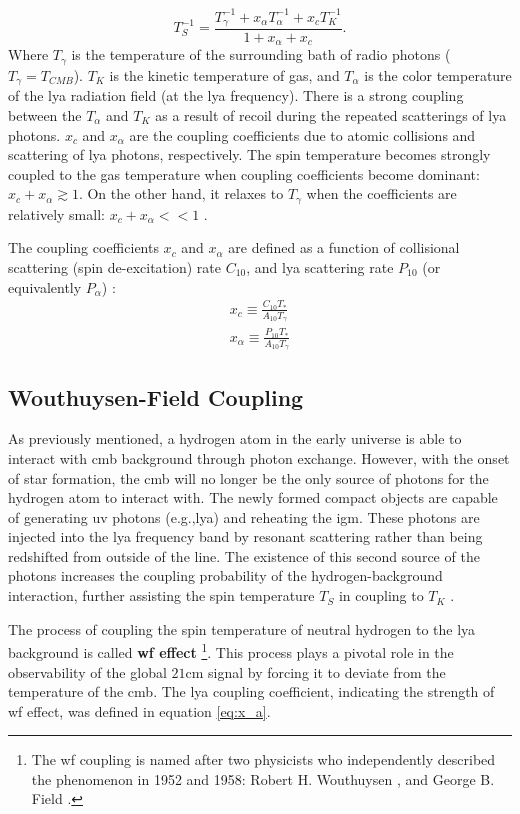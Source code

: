 \documentclass[12pt, TexShade, letterpaper]{report}
\begin{document}
\begin{equation}
    T^{-1}_S = \frac{T^{-1}_\gamma + x_\alpha T^{-1}_\alpha + x_c T^{-1}_K}{1 + x_\alpha + x_c}. \label{eq:spin_temperature_coupling}
\end{equation}
Where $T_\gamma$ is the temperature of the surrounding bath of radio photons ($T_\gamma = T_{CMB}$). $T_K$ is the kinetic temperature of gas, and $T_\alpha$ is the color temperature of the \gls{lya} radiation field (at the \gls{lya} frequency). There is a strong coupling between the $T_\alpha$ and $T_K$ as a result of recoil during the repeated scatterings of \gls{lya} photons. $x_c$ and $x_\alpha$ are the coupling coefficients due to atomic collisions and scattering of \gls{lya} photons, respectively. The spin temperature becomes strongly coupled to the gas temperature when coupling coefficients become dominant: $x_c + x_\alpha \gtrsim 1$. On the other hand, it relaxes to $T_\gamma$ when the coefficients are relatively small: $x_c + x_\alpha << 1$ \cite{21century, low_frequency}. \par
The coupling coefficients $x_c$ and $x_\alpha$ are defined as a function of collisional scattering (spin de-excitation) rate $C_{10}$, and \gls{lya} scattering rate $P_{10}$ (or equivalently $P_\alpha$) \cite{explore_cosmic_dawn, low_frequency}:
\begin{gather}
    x_c \equiv \frac{C_{10}T_*}{A_{10}T_\gamma}\\
    x_\alpha \equiv \frac{P_{10} T_*}{A_{10}T_\gamma} \label{eq:x_a}
\end{gather}
\subsection{Wouthuysen-Field Coupling}
As previously mentioned, a hydrogen atom in the early universe is able to interact with \gls{cmb} background through photon exchange. However, with the onset of star formation, the \gls{cmb} will no longer be the only source of photons for the hydrogen atom to interact with. The newly formed compact objects are capable of generating \gls{uv} photons (e.g.,\gls{lya}) and reheating the \gls{igm}. These photons are injected into the \gls{lya} frequency band by resonant scattering rather than being redshifted from outside of the line. The existence of this second source of the photons increases the coupling probability of the hydrogen-background interaction, further assisting the spin temperature $T_S$ in coupling to $T_K$ \cite{21century, low_frequency}.\par
The process of coupling the spin temperature of neutral hydrogen to the \gls{lya} background is called \textbf{\gls{wf} effect} \cite{barkana2001beginning}\footnote{The \gls{wf} coupling is named after two physicists who independently described the phenomenon in 1952 and 1958: Robert H. Wouthuysen \cite{wouthuysen_original}, and George B. Field \cite{field_original}.}. This process plays a pivotal role in the observability of the global $\mathrm{21cm}$ signal by forcing it to deviate from the temperature of the \gls{cmb}. The \gls{lya} coupling coefficient, indicating the strength of \gls{wf} effect, was defined in equation \ref{eq:x_a}. \par
\end{document}
